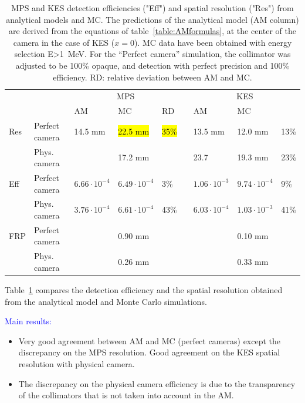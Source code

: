 \documentclass[a4paper,english,12pt]{article}
\newcommand{\et}[2][blue]{\textcolor{#1}{#2}}
\begin{document}
\begin{table}[h]
\centering
\begin{tabular}{lllllllll}
	\midrule
	\multicolumn{2}{c}{}				& \multicolumn{3}{c}{MPS}																	&& \multicolumn{3}{c}{KES}										\\
	\cline{3-5}\cline{7-9}
	\multicolumn{2}{c}{}				& AM 										& MC 									& RD	 			&& AM 										& MC							\\
	\midrule
	Res	& Perfect camera				& 14.5 mm								& \hl{22.5 mm} 	 			& \hl{35\%}	&& 13.5 mm								& 12.0 mm									& 13\%  \\
		& Phys. camera					& 					& 17.2 mm 	 					&						&& 23.7									& 19.3 mm									& 23\% \\

	\midrule
	Eff    & Perfect camera			&  $6.66 \cdot 10^{-4}$ & $6.49\cdot10^{-4}$	&	3\%					&& $1.06 \cdot 10^{-3}$  & $9.74\cdot10^{-4}$			& 9\%\\
	       & Phys. camera				&  $3.76 \cdot 10^{-4}$	& $6.61\cdot10^{-4}$	&	43\%					&& $6.03 \cdot 10^{-4}$	& $1.03\cdot10^{-3}$	& 41\%\\
 	\midrule
	FRP    & Perfect camera			&  & 0.90 mm	&  &&  & 0.10 mm			& \\
	       & Phys. camera				&  & 0.26 mm	&  && 	& 0.33 mm	& \\
 	\midrule
\end{tabular}
\caption{MPS and KES detection efficiencies ("Eff") and spatial resolution ("Res") from analytical models and MC. The predictions of the analytical model (AM column) are derived from the equations of table~\ref{table:AMformulas}, at the center of the camera in the case of KES ($x=0$). MC data have been obtained with energy selection E>1~MeV. For the \enquote{Perfect camera} simulation, the collimator was adjusted to be 100\% opaque, and detection with perfect precision and 100\% efficiency. RD: relative deviation between AM and MC.}
\label{tab:AMV}
\end{table}

Table~\ref{tab:AMV} compares the detection efficiency and the spatial resolution obtained from the analytical model and Monte Carlo simulations. 

\et{Main results:}
\begin{itemize}
	\item Very good agreement between AM and MC (perfect cameras) except the discrepancy on the MPS resolution. Good agreement on the KES spatial resolution with physical camera.
	\item The discrepancy on the physical camera efficiency is due to the transparency of the collimators that is not taken into account in the AM.
\end{itemize}
\end{document}
